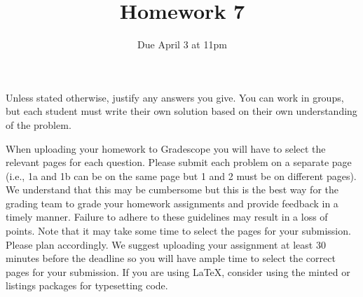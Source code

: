 \documentclass[12pt]{article}
\begin{document}
\title{\sc Homework 7}
\date{Due April 3 at 11pm} 
\author{}
\maketitle




\newtheorem*{problem}{Problem}
\newtheorem*{heuristic}{Heuristic}
\newtheorem*{conjecture}{Conjecture}
\newtheorem{theorem}{Theorem}[section]
\newtheorem{corollary}[theorem]{Corollary}
\newtheorem{prop}[theorem]{Proposition}
\newtheorem{lemma}[theorem]{Lemma}
\newtheorem{definition}[theorem]{Definition}
\theoremstyle{remark}
\newtheorem{example}[theorem]{Example}
\newtheorem{remark}[theorem]{Remark}
\newtheorem{exercise}[theorem]{Exercise}


Unless stated otherwise, justify any answers you give. You can work in groups, but each student
must write their own solution based on their own understanding of the problem.

When uploading your homework to Gradescope you will have to select the relevant pages
for each question. Please submit each problem on a separate page (i.e., 1a and 1b can be on
the same page but 1 and 2 must be on different pages). We understand that this may be
cumbersome but this is the best way for the grading team to grade your homework assignments and provide feedback in a timely manner. Failure to adhere to these guidelines may
result in a loss of points. Note that it may take some time to select the pages for your submission. Please plan accordingly. We suggest uploading your assignment at least 30 minutes
before the deadline so you will have ample time to select the correct pages for your submission. If you are using \LaTeX, consider using the minted or listings packages for typesetting code.

\medskip
\end{document}
